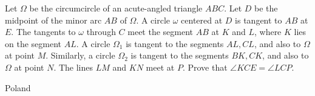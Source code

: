 Let  $\Omega$ be the circumcircle of an acute-angled triangle $ABC$. Let $D$ be the midpoint of the minor arc $AB$ of $\Omega$. A circle  $\omega$ centered at $D$ is tangent to $AB$ at $E$. The tangents to $\omega$ through $C$ meet the segment $AB$ at $K$ and $L$, where $K$ lies on the segment $AL$. A circle  $\Omega_1$ is tangent to the segments $AL, CL$, and also to $ \Omega$  at point $M$. Similarly, a circle  $\Omega_2$ is tangent to the segments $BK, CK$, and also to  $\Omega$ at point $N$. The lines $LM$ and $KN$ meet at $P$. Prove that $\angle KCE = \angle LCP$.

Poland